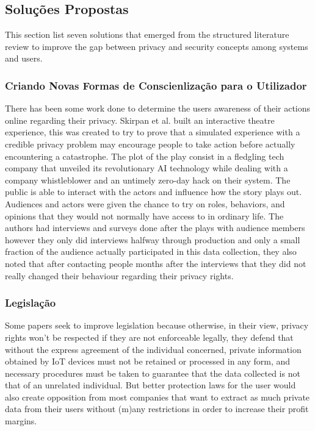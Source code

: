 \documentclass[conference]{IEEEtran}
\begin{document}
\subsection{Soluções Propostas}

\par This section list seven solutions that emerged from the structured
literature review to improve the gap between privacy and security concepts
among systems and users.

\subsubsection{Criando Novas Formas de Conscienlização para o Utilizador}

There has been some work done to determine the users awareness of their
actions online regarding their privacy. Skirpan et al. \cite{SkirpanPrivacy}
built an interactive theatre experience, this was created to try to prove
that a simulated experience with a credible privacy problem may encourage
people to take action before actually encountering a catastrophe. The plot
of the play consist in a fledgling tech company that unveiled its revolutionary
AI technology while dealing with a company whistleblower and an untimely
zero-day hack on their system. The public is able to interact with the actors
and influence how the story plays out. Audiences and actors were given the
chance to try on roles, behaviors, and opinions that they would not normally
have access to in ordinary life. The authors had interviews and surveys
done after the plays with audience members however they only did interviews
halfway through production and only a small fraction of the audience actually
participated in this data collection, they also noted that after contacting
people months after the interviews that they did not really changed their
behaviour regarding their privacy rights.

\subsubsection{Legislação}

Some papers seek to improve legislation \cite{WEBER2015618, FabianoInternet}
because otherwise, in their view, privacy rights won't be respected if they
are not enforceable legally, they defend that without the express agreement
of the individual concerned, private information obtained by IoT devices
must not be retained or processed in any form, and necessary procedures
must be taken to guarantee that the data collected is not that of an unrelated
individual. But better protection laws for the user would also create opposition
from most companies that want to extract as much private data from their
users without (m)any restrictions in order to increase their profit margins.
\end{document}
